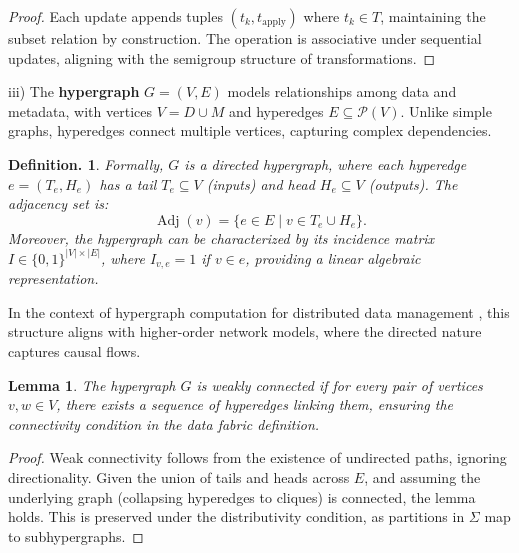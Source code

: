\documentclass{amsart}
\newtheorem{lem}{Lemma}
\newtheorem{defn}[thm]{Definition.}
\DeclareMathOperator\Adj{Adj}
\begin{document}
\begin{proof}
Each update appends tuples \( (t_k, t_{\text{apply}}) \) where \( t_k \in T \), maintaining the subset relation by construction. The operation is associative under sequential updates, aligning with the semigroup structure of transformations.
\end{proof}


iii) The \textbf{hypergraph} \( G = (V, E) \) models relationships among data and metadata, with vertices \( V = D \cup M \) and hyperedges \( E \subseteq \mathcal{P}(V) \). Unlike simple graphs, hyperedges connect multiple vertices, capturing complex dependencies.

\begin{defn}\label{subsec:hypergraph_prelim}
 Formally, \( G \) is a directed hypergraph, where each hyperedge \( e = (T_e, H_e) \) has a tail \( T_e \subseteq V \) (inputs) and head \( H_e \subseteq V \) (outputs). The adjacency set is:
%
\[
\Adj(v) = \{ e \in E \mid v \in T_e \cup H_e \}.
\]
%
Moreover, the hypergraph can be characterized by its incidence matrix \( I \in \{0,1\}^{|V| \times |E|} \), where \( I_{v,e} = 1 \) if \( v \in e \), providing a linear algebraic representation.
\end{defn}

In the context of hypergraph computation for distributed data management \cite{tang2025hypergraph}, this structure aligns with higher-order network models, where the directed nature captures causal flows.

\begin{lem} \label{lem:hypergraph_connectivity}
The hypergraph \( G \) is weakly connected if for every pair of vertices \( v, w \in V \), there exists a sequence of hyperedges linking them, ensuring the connectivity condition in the data fabric definition.
\end{lem}

\begin{proof}
Weak connectivity follows from the existence of undirected paths, ignoring directionality. Given the union of tails and heads across \( E \), and assuming the underlying graph (collapsing hyperedges to cliques) is connected, the lemma holds. This is preserved under the distributivity condition, as partitions in \( \Sigma \) map to subhypergraphs.
\end{proof}
\end{document}
